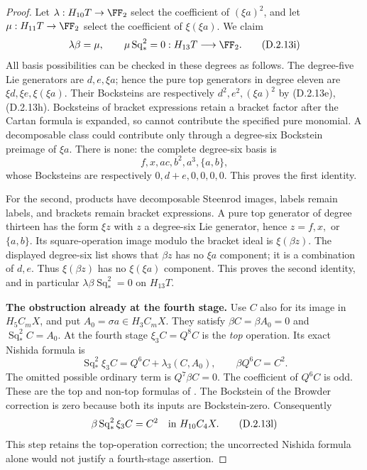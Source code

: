 \begin{proof}
Let $\lambda:H_{10}T\to\FF_2$ select the coefficient of
$(\xi a)^2$, and let $\mu:H_{11}T\to\FF_2$ select the coefficient
of $\xi(\xi a)$. We claim
\[
 \lambda\beta=\mu,\qquad
 \mu\operatorname{Sq}_*^2=0:H_{13}T\longrightarrow\FF_2.
 \tag{D.2.13i}
\]
All basis possibilities can be checked in these degrees as follows.
The degree-five Lie generators are $d,e,\xi a$; hence the pure
top generators in degree eleven are $\xi d,\xi e,\xi(\xi a)$.
Their Bocksteins are respectively $d^2,e^2,(\xi a)^2$ by
\textup{(D.2.13e),(D.2.13h)}. Bocksteins of bracket expressions
retain a bracket factor after the Cartan formula is expanded, so
cannot contribute the specified pure monomial. A decomposable
class could contribute only through a degree-six Bockstein
preimage of $\xi a$. There is none: the complete degree-six
basis is
\[
 f, x, ac, b^2, a^3, \{a,b\},
 \tag{D.2.13j}
\]
whose Bocksteins are respectively $0,d+e,0,0,0,0$.
This proves the first identity.

For the second, products have decomposable Steenrod images,
labels remain labels, and brackets remain bracket expressions.
A pure top generator of degree thirteen has the form $\xi z$
with $z$ a degree-six Lie generator, hence $z=f,x,$ or $\{a,b\}$.
Its square-operation image modulo the bracket ideal is
$\xi(\beta z)$. The displayed degree-six list shows that
$\beta z$ has no $\xi a$ component; it is a combination of
$d,e$. Thus $\xi(\beta z)$ has no $\xi(\xi a)$ component.
This proves the second identity, and in particular
$\lambda\beta\operatorname{Sq}_*^2=0$ on $H_{13}T$.

\medskip\noindent
\textbf{The obstruction already at the fourth stage.}
Use $C$ also for its image in $H_5C_mX$, and put
$A_0=\sigma a\in H_3C_mX$. They satisfy
$\beta C=\beta A_0=0$ and $\operatorname{Sq}_*^2C=A_0$.
At the fourth stage $\xi_3C=Q^8C$ is the \emph{top} operation.
Its exact Nishida formula is
\[
 \operatorname{Sq}_*^2\xi_3C
       =Q^6C+\lambda_3(C,A_0),\qquad
 \beta Q^6C=C^2.
 \tag{D.2.13k}
\]
The omitted possible ordinary term is $Q^7\beta C=0$.
The coefficient of $Q^6C$ is odd. These are the top and non-top
formulas of \cite[Chapter III, Theorems~1.1--1.3,
especially pp.~217--218]{I_CohenLadaMay1976}.
The Bockstein of the Browder correction is zero because both
its inputs are Bockstein-zero. Consequently
\[
 \beta\operatorname{Sq}_*^2\xi_3C=C^2
       \quad\hbox{in }H_{10}C_4X.
 \tag{D.2.13l}
\]
This step retains the top-operation correction; the uncorrected
Nishida formula alone would not justify a fourth-stage assertion.


\end{proof}
